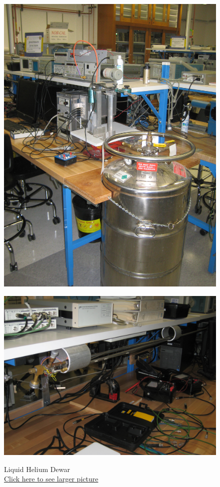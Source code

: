 \documentclass{../lab}
\begin{document}
\begin{figure}[H]
\captionsetup{justification=centering}
  \href{http://experimentationlab.berkeley.edu/sites/default/files/images/JOS-Dewar_3508.jpg}{\includegraphics[width=\linewidth,keepaspectratio]{images/JOS-Dewar_3508.jpg}}
  \caption{Liquid Helium Dewar \\
  \href{http://experimentationlab.berkeley.edu/sites/default/files/images/JOS-Dewar_3508.jpg}{Click here to see larger picture}}
  \label{fig:JOS-Dewar_3508.jpg}
\endminipage\hfill
{}
  \href{http://experimentationlab.berkeley.edu/sites/default/files/images/JOS-Probes_3506.jpg}{\includegraphics[width=\linewidth,keepaspectratio]{images/JOS-Probes_3506.jpg}}

\end{figure}
\end{document}
